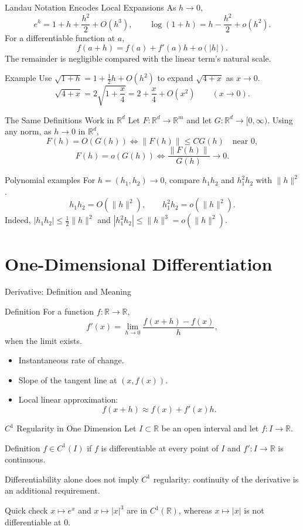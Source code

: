 \documentclass[aspectratio=169]{beamer}
\newcommand{\R}{\mathbb{R}}
\begin{document}
\begin{frame}{Landau Notation Encodes Local Expansions}
As $h\to0$,
\[
e^h=1+h+\frac{h^2}{2}+O(h^3),
\qquad
\log(1+h)=h-\frac{h^2}{2}+o(h^2).
\]
\pause
For a differentiable function at $a$,
\[
f(a+h)=f(a)+f'(a)h+o(|h|).
\]
The remainder is negligible compared with the linear term's natural scale.
\pause
\begin{exampleblock}{Example}
Use $\sqrt{1+h}=1+\tfrac12h+O(h^2)$ to expand $\sqrt{4+x}$ as $x\to0$.
\pause
\[
\sqrt{4+x}=2\sqrt{1+\frac{x}{4}}
=2+\frac{x}{4}+O(x^2)
\qquad (x\to0).
\]
\end{exampleblock}
\end{frame}

\begin{frame}{The Same Definitions Work in $\R^d$}
Let $F:\R^d\to\R^m$ and let $G:\R^d\to[0,\infty)$.
Using any norm, as $h\to0$ in $\R^d$,
\[
F(h)=O(G(h))
\iff
\|F(h)\|\leq C G(h)\quad\text{near }0,
\]
\[
F(h)=o(G(h))
\iff
\frac{\|F(h)\|}{G(h)}\longrightarrow0.
\]
\pause
\begin{exampleblock}{Polynomial examples}
For $h=(h_1,h_2)\to0$, compare $h_1h_2$ and $h_1^2h_2$ with
$\|h\|^2$.
\pause
\[
h_1h_2=O(\|h\|^2),
\qquad
h_1^2h_2=o(\|h\|^2).
\]
Indeed, $|h_1h_2|\leq\tfrac12\|h\|^2$ and
$|h_1^2h_2|\leq\|h\|^3=o(\|h\|^2)$.
\end{exampleblock}
\end{frame}

\section{One-Dimensional Differentiation}

\begin{frame}{Derivative: Definition and Meaning}
\begin{block}{Definition}
For a function $f:\R\to\R$,
\[
f'(x)=\lim_{h\to 0}\frac{f(x+h)-f(x)}{h},
\]
when the limit exists.
\end{block}
\pause
\begin{itemize}
  \item Instantaneous rate of change.
  \item Slope of the tangent line at $(x,f(x))$.
  \item Local linear approximation:
  \[
  f(x+h)\approx f(x)+f'(x)h.
  \]
\end{itemize}
\end{frame}

\begin{frame}{$C^1$ Regularity in One Dimension}
Let $I\subset\R$ be an open interval and let $f:I\to\R$.
\begin{block}{Definition}
$f\in C^1(I)$ if $f$ is differentiable at every point of $I$ and
$f':I\to\R$ is continuous.
\end{block}
\pause
Differentiability alone does not imply $C^1$ regularity: continuity of the
derivative is an additional requirement.
\begin{exampleblock}{Quick check}
$x\mapsto e^x$ and $x\mapsto|x|^3$ are in $C^1(\R)$, whereas
$x\mapsto|x|$ is not differentiable at $0$.
\end{exampleblock}
\end{frame}
\end{document}
